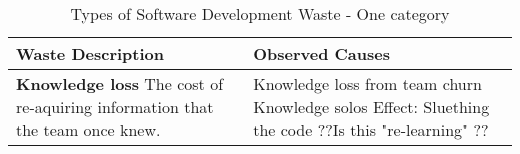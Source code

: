 \begin{table*}[htbp]
\renewcommand{\arraystretch}{1.3}
\centering
\caption{Types of Software Development Waste - One category}
\label{Waste}
\begin{tabular}{|p{2.5in}|p{3.6in}|} %
\hline
\textbf{Waste} \newline Description  & Observed Causes 
\\ \hline
\textbf{Knowledge loss} \newline   
The cost of re-aquiring information that the team once knew. & 
Knowledge loss from team churn \newline
Knowledge solos \newline
Effect: Sluething the code \newline
??Is this "re-learning" ??
\\ \hline
\end{tabular} 
\end{table*}


